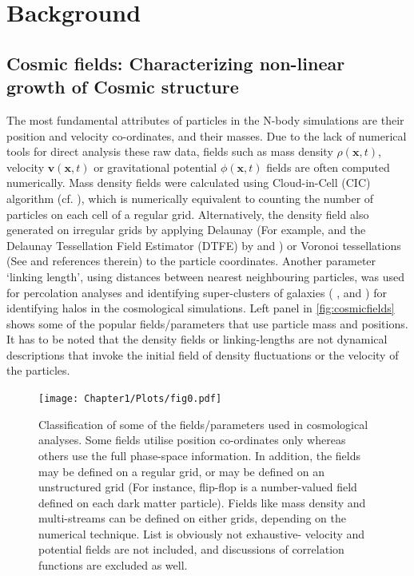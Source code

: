 \chapter{Background}\label{chapter2}


\section{Cosmic fields: Characterizing non-linear growth of Cosmic structure}


The most fundamental attributes of particles in the N-body simulations are their position and velocity co-ordinates, and their masses. Due to the lack of numerical tools for direct analysis these raw data, fields such as mass density $\rho(\mathbf{x}, t)$, velocity $\mathbf{v}(\mathbf{x}, t)$ or gravitational potential $\phi(\mathbf{x}, t)$ fields are often computed numerically. Mass density fields were calculated using Cloud-in-Cell (CIC) algorithm (cf. \citealt{Hockney1988}), which is numerically equivalent to counting the number of particles on each cell of a regular grid. Alternatively, the density field also generated on irregular grids by applying Delaunay (For example, \citealt{Icke1991} and the Delaunay Tessellation Field Estimator (DTFE) by \citealt{Schaap2000} and \citealt{Weygaert2009a}) or Voronoi tessellations (See \citealt{Schaap2000} and references therein) to the particle coordinates. Another parameter `linking length', using distances between nearest neighbouring particles, was used for percolation analyses and identifying super-clusters of galaxies ( \citealt{Zeldovich1982}, \citealt{Shandarin1983} and \citealt{Shandarin1983b}) for identifying halos \citealt{Davis1985} in the cosmological simulations. Left panel in \autoref{fig:cosmicfields} shows some of the popular fields/parameters that use particle mass and positions. It has to be noted that the density fields or linking-lengths are not dynamical descriptions that invoke the initial field of density fluctuations or the velocity of the particles. 


\begin{figure}
\begin{minipage}[t]{0.99\linewidth}
 \centering\texttt{[image: Chapter1/Plots/fig0.pdf]} 
\end{minipage}\hfill
{}
\caption{Classification of some of the fields/parameters used in cosmological analyses. Some fields utilise position co-ordinates only whereas others use the full phase-space information. In addition, the fields may be defined on a regular grid, or may be defined on an unstructured grid (For instance, flip-flop is a number-valued field defined on each dark matter particle). Fields like mass density and multi-streams can be defined on either grids, depending on the numerical technique. List is obviously not exhaustive- velocity and potential fields are not included, and discussions of correlation functions are excluded as well.}
\label{fig:cosmicfields}
\end{figure}


